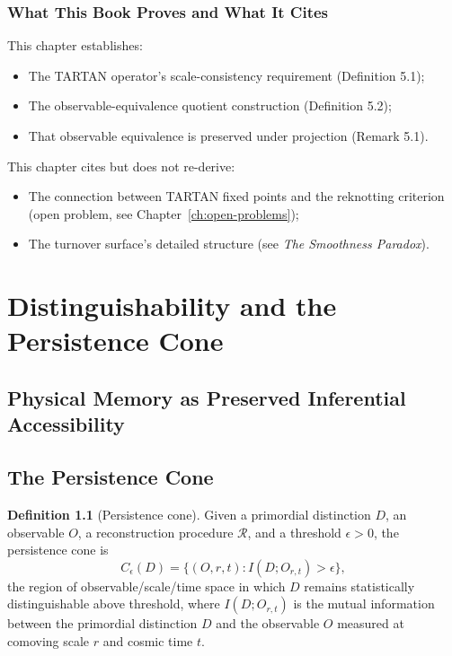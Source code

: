 \documentclass[12pt,a4paper,twoside,openright]{book}
\theoremstyle{plain}
\theoremstyle{definition}
\newtheorem{definition}[theorem]{Definition}
\theoremstyle{remark}
\newcommand{\Pcone}{C_\epsilon}
\begin{document}
\subsection{What This Book Proves and What It Cites}

This chapter establishes:
\begin{itemize}
\item The TARTAN operator's scale-consistency requirement (Definition 5.1);
\item The observable-equivalence quotient construction (Definition 5.2);
\item That observable equivalence is preserved under projection (Remark 5.1).
\end{itemize}

This chapter cites but does not re-derive:
\begin{itemize}
\item The connection between TARTAN fixed points and the reknotting criterion (open problem, see Chapter~\ref{ch:open-problems});
\item The turnover surface's detailed structure (see \emph{The Smoothness Paradox}).
\end{itemize}


\chapter{Distinguishability and the Persistence Cone}
\label{ch:persistence-cone}


\section{Physical Memory as Preserved Inferential Accessibility}

\section{The Persistence Cone}

\begin{definition}[Persistence cone]
Given a primordial distinction $D$, an observable $O$, a reconstruction procedure $\mathcal{R}$, and a threshold $\epsilon > 0$, the persistence cone is
\[
\Pcone(D) = \{(O, r, t) : I(D; O_{r,t}) > \epsilon\},
\]
the region of observable/scale/time space in which $D$ remains statistically distinguishable above threshold, where $I(D; O_{r,t})$ is the mutual information between the primordial distinction $D$ and the observable $O$ measured at comoving scale $r$ and cosmic time $t$.
\end{definition}
\end{document}
